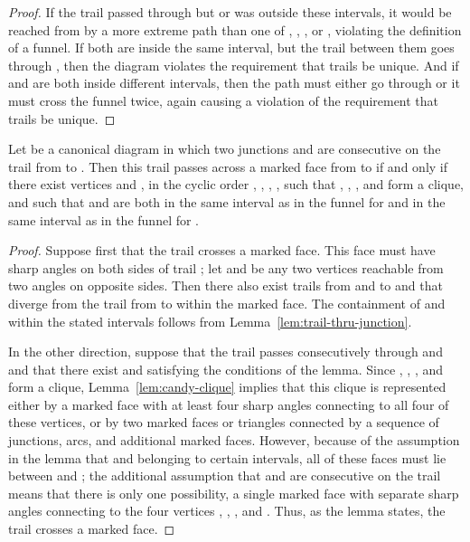 \documentclass{llncs}
\begin{document}
\begin{proof}
If the trail
passed through  but  or  was outside these intervals, it would be
reached from  by a more extreme path than one of , , , or ,
violating the definition of a funnel. If both are inside the same interval, but the trail between them goes through , then the diagram violates the requirement that trails be unique.
And if  and  are both inside
different intervals, then the path must either go through  or it must
cross the funnel twice, again causing a violation of the requirement that trails be unique.
\end{proof}

\begin{lemma}
\label{lem:trail-across-mark}
Let  be a canonical diagram in which two junctions  and  are consecutive on the trail from  to . Then this trail passes across a marked face from  to  if and only if there exist vertices  and , in the cyclic order , , , , such that , , , and  form a clique, and such that  and  are both in the same interval as  in the funnel for  and in the same interval as  in the funnel for .
\end{lemma}

\begin{proof}
Suppose first that the trail crosses a marked face. This face must have sharp angles on both sides of trail ; let  and  be any two vertices reachable from two angles on opposite sides.  Then there also exist trails from  and  to  and  that diverge from the trail from  to  within the marked face. The containment of  and  within the stated intervals follows from Lemma~\ref{lem:trail-thru-junction}.

In the other direction, suppose that the trail passes consecutively through  and  and that there exist  and  satisfying the conditions of the lemma. Since , , , and  form a clique, Lemma~\ref{lem:candy-clique} implies that this clique is represented either by a marked face with at least four sharp angles connecting to all four of these vertices, or by two marked faces or triangles connected by a sequence of junctions, arcs, and additional marked faces. However, because of the assumption in the lemma that  and  belonging to certain intervals, all of these faces must lie between  and ; the additional assumption that  and  are consecutive on the trail means that there is only one possibility, a single marked face with separate sharp angles connecting to the four vertices , , , and . Thus, as the lemma states, the trail crosses a marked face.
\end{proof}
\end{document}

